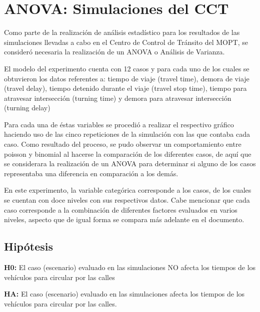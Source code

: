 \section{ANOVA: Simulaciones del CCT}

Como parte de la realizaci\'{o}n de an\'{a}lisis estad\'{i}stico para los resultados de las simulaciones llevadas a cabo en el Centro de Control de Tr\'{a}nsito del MOPT, se consider\'{o} necesaria la realizaci\'{o}n de un ANOVA o An\'{a}lisis de Varianza.

El modelo del experimento cuenta con 12 casos y para cada uno de los cuales se obtuvieron los datos referentes a: tiempo de viaje (travel time), demora de viaje (travel delay), tiempo detenido durante el viaje (travel stop time), tiempo para atravesar intersecci\'{o}n (turning time) y demora para atravesar intersecci\'{o}n (turning delay)

Para cada una de \'{e}stas variables se procedi\'{o} a realizar el respectivo gr\'{a}fico haciendo uso de las cinco repeticiones de la simulaci\'{o}n con las que contaba cada caso. Como resultado del proceso, se pudo observar un comportamiento entre poisson y binomial al hacerse la comparaci\'{o}n de los diferentes casos, de aqu\'{i} que se considerara la realizaci\'{o}n de un ANOVA para determinar si alguno de los casos representaba una diferencia en comparaci\'{o}n a los dem\'{a}s.

En este experimento, la variable categ\'{o}rica corresponde a los casos, de los cuales se cuentan con doce niveles con sus respectivos datos. Cabe mencionar que cada caso corresponde a la combinaci\'{o}n de diferentes factores evaluados en varios niveles, aspecto que de igual forma se compara m\'{a}s adelante en el documento.

\subsection{Hip\'{o}tesis}

\begin{description}
	\item \textbf{H0:} El caso (escenario) evaluado en las simulaciones NO afecta los tiempos de los veh\'{i}culos para circular por las calles

	\item \textbf{HA:} El caso (escenario) evaluado en las simulaciones afecta los tiempos de los veh\'{i}culos para circular por las calles.
\end{description}